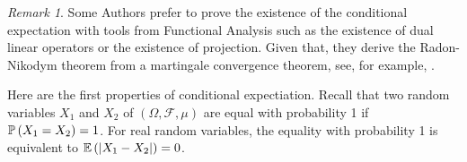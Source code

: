 \documentclass[12pt,a4paper]{amsart}
\newcommand{\one}{\bm 1}
\theoremstyle{plain}%
\theoremstyle{definition}
\theoremstyle{remark}
\newtheorem{remark}{Remark}
\begin{document}


\begin{remark}
  Some Authors prefer to prove the existence of the conditional
  expectation with tools from Functional Analysis such as the
  existence of dual linear operators or the existence of
  projection. Given that, they derive the Radon-Nikodym theorem from
  a martingale convergence theorem, see, for example,
  \cite[\S~IV.2]{malliavin:1995}.
\end{remark}

Here are the first properties of conditional expectiation. Recall that
two random variables $X_1$ and $X_2$ of $(\Omega,\mathcal F,\mu)$ are
equal with probability 1 if $\operatorname{\mathbb P}\left(X_1 = X_2\right) = 1$. For real random
variables, the equality with probability 1 is equivalent to $\operatorname{\mathbb E}\left(\left\vert X_1-X_2\right\vert\right)=0$.
\end{document}
